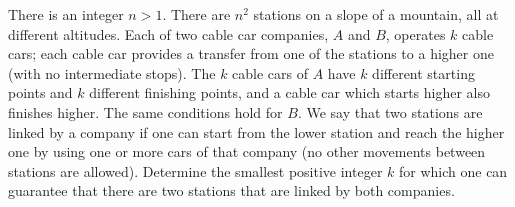 There is an integer $n > 1$.
There are $n^2$ stations on a slope of a mountain, all at different altitudes.
Each of two cable car companies, $A$ and $B$, operates $k$ cable cars;
each cable car provides a transfer from one of the stations
to a higher one (with no intermediate stops).
The $k$ cable cars of $A$ have $k$ different starting points
and $k$ different finishing points, and a cable car which starts higher also finishes higher.
The same conditions hold for $B$.
We say that two stations are linked by a company if one can start from the lower station
and reach the higher one by using one or more cars of that company
(no other movements between stations are allowed).
Determine the smallest positive integer $k$ for which one can guarantee
that there are two stations that are linked by both companies.